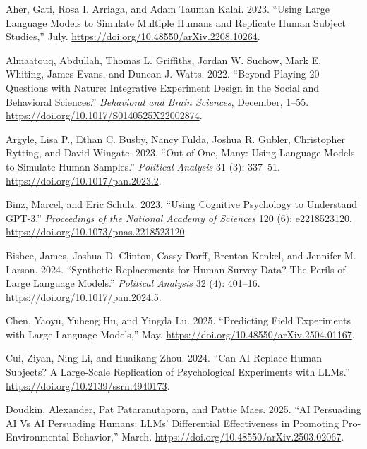 \documentclass[
  letterpaper,
  DIV=11,
  numbers=noendperiod]{scrartcl}
\newlength{\cslhangindent}
\newenvironment{CSLReferences}[2] %
 {\begin{list}{}{%
  \setlength{\itemindent}{0pt}
  \setlength{\leftmargin}{0pt}
  \setlength{\parsep}{0pt}
  \ifodd #1
   \setlength{\leftmargin}{\cslhangindent}
   \setlength{\itemindent}{-1\cslhangindent}
  \fi
  \setlength{\itemsep}{#2\baselineskip}}}
 {\end{list}}
\begin{document}
\label{refs}
\begin{CSLReferences}{1}{0}
Aher, Gati, Rosa I. Arriaga, and Adam Tauman Kalai. 2023. {``Using Large
Language Models to Simulate Multiple Humans and Replicate Human Subject
Studies,''} July. \url{https://doi.org/10.48550/arXiv.2208.10264}.

Almaatouq, Abdullah, Thomas L. Griffiths, Jordan W. Suchow, Mark E.
Whiting, James Evans, and Duncan J. Watts. 2022. {``Beyond Playing 20
Questions with Nature: Integrative Experiment Design in the Social and
Behavioral Sciences.''} \emph{Behavioral and Brain Sciences}, December,
1--55. \url{https://doi.org/10.1017/S0140525X22002874}.

Argyle, Lisa P., Ethan C. Busby, Nancy Fulda, Joshua R. Gubler,
Christopher Rytting, and David Wingate. 2023. {``Out of One, Many: Using
Language Models to Simulate Human Samples.''} \emph{Political Analysis}
31 (3): 337--51. \url{https://doi.org/10.1017/pan.2023.2}.

Binz, Marcel, and Eric Schulz. 2023. {``Using Cognitive Psychology to
Understand GPT-3.''} \emph{Proceedings of the National Academy of
Sciences} 120 (6): e2218523120.
\url{https://doi.org/10.1073/pnas.2218523120}.

Bisbee, James, Joshua D. Clinton, Cassy Dorff, Brenton Kenkel, and
Jennifer M. Larson. 2024. {``Synthetic Replacements for Human Survey
Data? The Perils of Large Language Models.''} \emph{Political Analysis}
32 (4): 401--16. \url{https://doi.org/10.1017/pan.2024.5}.

Chen, Yaoyu, Yuheng Hu, and Yingda Lu. 2025. {``Predicting Field
Experiments with Large Language Models,''} May.
\url{https://doi.org/10.48550/arXiv.2504.01167}.

Cui, Ziyan, Ning Li, and Huaikang Zhou. 2024. {``Can AI Replace Human
Subjects? A Large-Scale Replication of Psychological Experiments with
LLMs.''} \url{https://doi.org/10.2139/ssrn.4940173}.

Doudkin, Alexander, Pat Pataranutaporn, and Pattie Maes. 2025. {``AI
Persuading AI Vs AI Persuading Humans: LLMs' Differential Effectiveness
in Promoting Pro-Environmental Behavior,''} March.
\url{https://doi.org/10.48550/arXiv.2503.02067}.


\end{CSLReferences}
\end{document}
